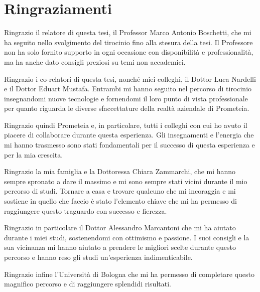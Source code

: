\clearpage
\chapter*{Ringraziamenti}

Ringrazio il relatore di questa tesi, il Professor Marco Antonio Boschetti, che mi ha seguito nello svolgimento del tirocinio fino alla stesura della tesi.
Il Professore non ha solo fornito supporto in ogni occasione con disponibilità e professionalità, ma ha anche dato consigli preziosi su temi non accademici.

Ringrazio i co-relatori di questa tesi, nonché miei colleghi, il Dottor Luca Nardelli e il Dottor Eduart Mustafa.
Entrambi mi hanno seguito nel percorso di tirocinio insegnandomi nuove tecnologie e fornendomi il loro punto di vista professionale per quanto riguarda le diverse sfaccettature della realtà aziendale di Prometeia.

Ringrazio quindi Prometeia e, in particolare, tutti i colleghi con cui ho avuto il piacere di collaborare durante questa esperienza.
Gli insegnamenti e l'energia che mi hanno trasmesso sono stati fondamentali per il successo di questa esperienza e per la mia crescita.

Ringrazio la mia famiglia e la Dottoressa Chiara Zammarchi, che mi hanno sempre spronato a dare il massimo e mi sono sempre stati vicini durante il mio percorso di studi.
Tornare a casa e trovare qualcuno che mi incoraggia e mi sostiene in quello che faccio è stato l'elemento chiave che mi ha permesso di raggiungere questo traguardo con successo e fierezza.

Ringrazio in particolare il Dottor Alessandro Marcantoni che mi ha aiutato durante i miei studi, sostenendomi con ottimismo e passione.
I suoi consigli e la sua vicinanza mi hanno aiutato a prendere le migliori scelte durante questo percorso e hanno reso gli studi un'esperienza indimenticabile.

Ringrazio infine l'Università di Bologna che mi ha permesso di completare questo magnifico percorso e di raggiungere splendidi risultati.

\clearpage
